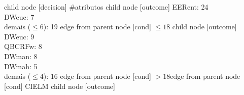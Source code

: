{%
child {node [decision] {\#atributos}
child {node [outcome] {
EERent: 24\\
DWeuc: 7\\
demais ($\leq 6$): 19} edge from parent node [cond] {$\leq18$}}
child {node [outcome] {
DWeuc: 9\\
QBCRFw: 8\\
DWman: 8\\
DWmah: 5\\
demais ($\leq 4$): 16} edge from parent node [cond] {$>18$}}edge from parent node [cond] {CIELM}}
child {node [outcome] {
}}}
